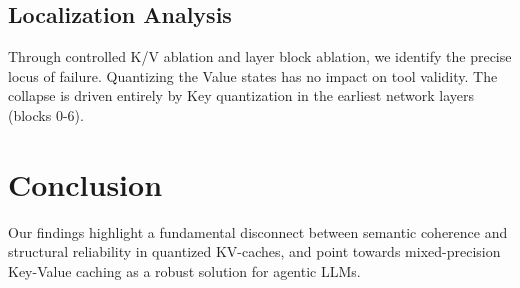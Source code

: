 \documentclass[11pt,a4paper]{article}
\begin{document}
\subsection{Localization Analysis}
Through controlled K/V ablation and layer block ablation, we identify the precise locus of failure. Quantizing the Value states has no impact on tool validity. The collapse is driven entirely by Key quantization in the earliest network layers (blocks 0-6).

\section{Conclusion}
Our findings highlight a fundamental disconnect between semantic coherence and structural reliability in quantized KV-caches, and point towards mixed-precision Key-Value caching as a robust solution for agentic LLMs.
\end{document}
